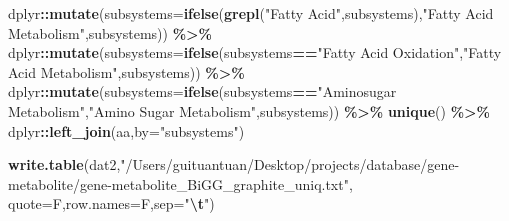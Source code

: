 \documentclass[
]{book}
\newenvironment{Shaded}{\begin{snugshade}}{\end{snugshade}}
\newcommand{\AttributeTok}[1]{\textcolor[rgb]{0.13,0.29,0.53}{#1}}
\newcommand{\FunctionTok}[1]{\textcolor[rgb]{0.13,0.29,0.53}{\textbf{#1}}}
\newcommand{\NormalTok}[1]{#1}
\newcommand{\SpecialCharTok}[1]{\textcolor[rgb]{0.81,0.36,0.00}{\textbf{#1}}}
\newcommand{\StringTok}[1]{\textcolor[rgb]{0.31,0.60,0.02}{#1}}
\begin{document}
\begin{Shaded}
\begin{Highlighting}[]
\NormalTok{  dplyr}\SpecialCharTok{::}\FunctionTok{mutate}\NormalTok{(}\AttributeTok{subsystems=}\FunctionTok{ifelse}\NormalTok{(}\FunctionTok{grepl}\NormalTok{(}\StringTok{"Fatty Acid"}\NormalTok{,subsystems),}\StringTok{"Fatty Acid Metabolism"}\NormalTok{,subsystems)) }\SpecialCharTok{\%\textgreater{}\%}
\NormalTok{  dplyr}\SpecialCharTok{::}\FunctionTok{mutate}\NormalTok{(}\AttributeTok{subsystems=}\FunctionTok{ifelse}\NormalTok{(subsystems}\SpecialCharTok{==}\StringTok{"Fatty Acid Oxidation"}\NormalTok{,}\StringTok{"Fatty Acid Metabolism"}\NormalTok{,subsystems)) }\SpecialCharTok{\%\textgreater{}\%}
\NormalTok{  dplyr}\SpecialCharTok{::}\FunctionTok{mutate}\NormalTok{(}\AttributeTok{subsystems=}\FunctionTok{ifelse}\NormalTok{(subsystems}\SpecialCharTok{==}\StringTok{"Aminosugar Metabolism"}\NormalTok{,}\StringTok{"Amino Sugar Metabolism"}\NormalTok{,subsystems)) }\SpecialCharTok{\%\textgreater{}\%}
  \FunctionTok{unique}\NormalTok{() }\SpecialCharTok{\%\textgreater{}\%}
\NormalTok{  dplyr}\SpecialCharTok{::}\FunctionTok{left\_join}\NormalTok{(aa,}\AttributeTok{by=}\StringTok{"subsystems"}\NormalTok{)}

\FunctionTok{write.table}\NormalTok{(dat2,}\StringTok{"/Users/guituantuan/Desktop/projects/database/gene{-}metabolite/gene{-}metabolite\_BiGG\_graphite\_uniq.txt"}\NormalTok{,}
            \AttributeTok{quote=}\NormalTok{F,}\AttributeTok{row.names=}\NormalTok{F,}\AttributeTok{sep=}\StringTok{"}\SpecialCharTok{\textbackslash{}t}\StringTok{"}\NormalTok{)}
\end{Highlighting}
\end{Shaded}
\end{document}
